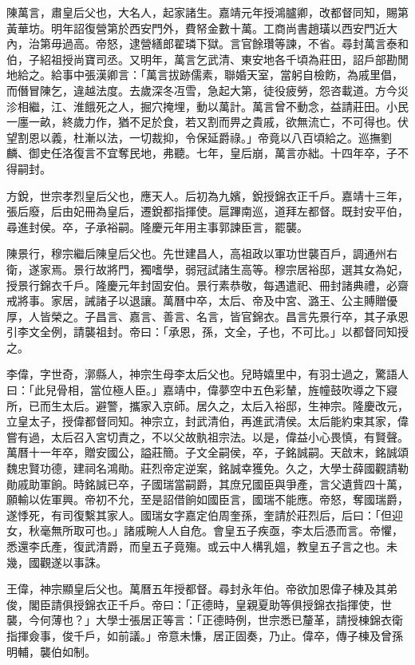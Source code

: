 \begin{pinyinscope}
陳萬言，肅皇后父也，大名人，起家諸生。嘉靖元年授鴻臚卿，改都督同知，賜第黃華坊。明年詔復營第於西安門外，費帑金數十萬。工商尚書趙璜以西安門近大內，治第毋過高。帝怒，逮營繕郎翟璘下獄。言官餘瓚等諫，不省。尋封萬言泰和伯，子紹祖授尚寶司丞。又明年，萬言乞武清、東安地各千頃為莊田，詔戶部勘閒地給之。給事中張漢卿言：「萬言拔跡儒素，聯婚天室，當躬自檢飭，為戚里倡，而僭冒陳乞，違越法度。去歲深冬冱雪，急起大第，徒役疲勞，怨咨載道。方今災沴相繼，江、淮餓死之人，掘穴掩埋，動以萬計。萬言曾不動念，益請莊田。小民一廛一畝，終歲力作，猶不足於食，若又割而畀之貴戚，欲無流亡，不可得也。伏望割恩以義，杜漸以法，一切裁抑，令保延爵祿。」帝竟以八百頃給之。巡撫劉麟、御史任洛復言不宜奪民地，弗聽。七年，皇后崩，萬言亦絀。十四年卒，子不得嗣封。

方銳，世宗孝烈皇后父也，應天人。后初為九嬪，銳授錦衣正千戶。嘉靖十三年，張后廢，后由妃冊為皇后，遷銳都指揮使。扈蹕南巡，道拜左都督。既封安平伯，尋進封侯。卒，子承裕嗣。隆慶元年用主事郭諫臣言，罷襲。

陳景行，穆宗繼后陳皇后父也。先世建昌人，高祖政以軍功世襲百戶，調通州右衛，遂家焉。景行故將門，獨嗜學，弱冠試諸生高等。穆宗居裕邸，選其女為妃，授景行錦衣千戶。隆慶元年封固安伯。景行素恭敬，每遇遣祀、冊封諸典禮，必齋戒將事。家居，誡諸子以退讓。萬曆中卒，太后、帝及中宮、潞王、公主賻贈優厚，人皆榮之。子昌言、嘉言、善言、名言，皆官錦衣。昌言先景行卒，其子承恩引李文全例，請襲祖封。帝曰：「承恩，孫，文全，子也，不可比。」以都督同知授之。

李偉，字世奇，漷縣人，神宗生母李太后父也。兒時嬉里中，有羽士過之，驚語人曰：「此兒骨相，當位極人臣。」嘉靖中，偉夢空中五色彩輦，旌幢鼓吹導之下寢所，已而生太后。避警，攜家入京師。居久之，太后入裕邸，生神宗。隆慶改元，立皇太子，授偉都督同知。神宗立，封武清伯，再進武清侯。太后能約束其家，偉嘗有過，太后召入宮切責之，不以父故骫祖宗法。以是，偉益小心畏慎，有賢聲。萬曆十一年卒，贈安國公，謚莊簡。子文全嗣侯，卒，子銘誠嗣。天啟末，銘誠頌魏忠賢功德，建祠名鴻勛。莊烈帝定逆案，銘誠幸獲免。久之，大學士薛國觀請勒勛戚助軍餉。時銘誠已卒，子國瑞當嗣爵，其庶兄國臣與爭產，言父遺貲四十萬，願輸以佐軍興。帝初不允，至是詔借餉如國臣言，國瑞不能應。帝怒，奪國瑞爵，遂悸死，有司復繫其家人。國瑞女字嘉定伯周奎孫，奎請於莊烈后，后曰：「但迎女，秋毫無所取可也。」諸戚畹人人自危。會皇五子疾亟，李太后憑而言。帝懼，悉還李氏產，復武清爵，而皇五子竟殤。或云中人構乳媼，教皇五子言之也。未幾，國觀遂以事誅。

王偉，神宗顯皇后父也。萬曆五年授都督。尋封永年伯。帝欲加恩偉子棟及其弟俊，閣臣請俱授錦衣正千戶。帝曰：「正德時，皇親夏助等俱授錦衣指揮使，世襲，今何薄也？」大學士張居正等言：「正德時例，世宗悉已釐革，請授棟錦衣衛指揮僉事，俊千戶，如前議。」帝意未慊，居正固奏，乃止。偉卒，傳子棟及曾孫明輔，襲伯如制。


\end{pinyinscope}
